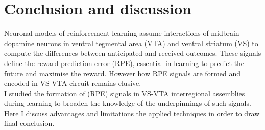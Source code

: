 \chapter{Conclusion and discussion}
\label{chap:Conclusion}
Neuronal models of reinforcement learning assume interactions of midbrain dopamine neurons in ventral tegmental area (VTA) and ventral striatum (VS) to compute the differences between anticipated and received outcomes. These signals define the reward prediction error (RPE), essential in learning to predict the future and maximise the reward. However how RPE signals are formed and encoded in VS-VTA circuit remains elusive.\\I studied the formation of (RPE) signals in VS-VTA interregional assemblies during learning to broaden the knowledge of the underpinnings of such signals. Here I discuss advantages and limitations the applied techniques in order to draw final conclusion.
